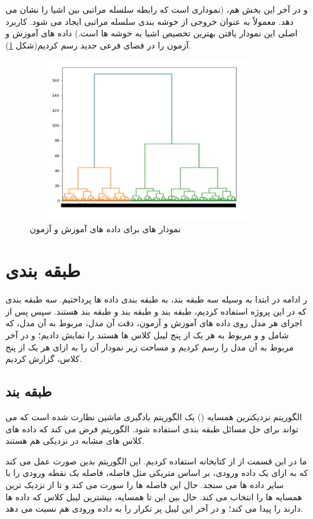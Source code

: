 \documentclass[12pt,onecolumn,a4paper]{article}
\begin{document}
و در آخر این بخش هم،  (نموداری است که رابطه سلسله مراتبی بین اشیا را نشان می دهد. معمولاً به عنوان خروجی از خوشه بندی سلسله مراتبی ایجاد می شود. کاربرد اصلی این نمودار یافتن بهترین تخصیص اشیا به خوشه ها است.) داده های آموزش و آزمون را در فضای فرعی جدید رسم کردیم(شکل \ref{fig:dendrogram}).

\begin{figure}
  \centering
  \includegraphics[width=10cm,height=7cm,keepaspectratio]{8.png}
  \caption{نمودار های  برای داده های آموزش و آزمون}
  \label{fig:dendrogram}
\end{figure}

\section{طبقه بندی}

ر ادامه در ابتدا به وسیله سه طبقه بند، به طبقه بندی داده ها پرداختیم. سه طبقه بندی که در این پروژه استفاده کردیم، طبقه بند  و طبقه بند  و طبقه بند  هستند. سپس پس از اجرای هر مدل روی داده های آموزش و آزمون، دقت آن مدل،  مربوط به آن مدل، که شامل  و  و  مربوط به هر یک از پنج لیبل کلاس ها هستند را نمایش دادیم؛ و در آخر  مربوط به آن مدل را رسم کردیم و مساحت زیر نمودار آن را به ازای هر یک از پنج کلاس، گزارش کردیم.


\subsection{طبقه بند }
الگوریتم  نزدیکترین همسایه () یک الگوریتم یادگیری ماشین نظارت شده است که می تواند برای حل مسائل طبقه بندی استفاده شود. الگوریتم  فرض می کند که داده های کلاس های مشابه در نزدیکی هم هستند. 

ما در این قسمت از  از کتابخانه  استفاده کردیم.
این الگوریتم بدین صورت عمل می کند که به ازای یک داده ورودی، بر اساس متریکی مثل فاصله، فاصله یک نقطه ورودی را با سایر داده ها می سنجد. حال این فاصله ها را سورت می کند و  تا از نزدیک ترین همسایه ها را انتخاب می کند. حال بین این  تا همسایه، بیشترین لیبل کلاس که داده ها دارند را پیدا می کند؛ و در آخر این لیبل پر تکرار را به داده ورودی هم نسبت می دهد.
\end{document}
